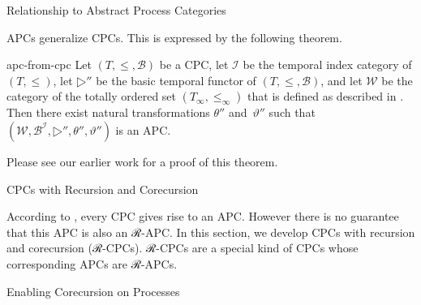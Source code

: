 \documentclass[copyright,creativecommons]{eptcs}
\begin{document}
              {Relationship to Abstract Process Categories}

APCs generalize CPCs. This is expressed by the following theorem.

\begin{exttheorem}{apc-from-cpc}
Let $(T, ≤, ℬ)$ be a CPC, let $ℐ$ be the temporal index category of $(T, ≤)$,
let $▷″$ be the basic temporal functor of $(T, ≤, ℬ)$, and let $𝒲$ be the
category of the totally ordered set $(T_∞, ≤_∞)$ that is defined as described in
. Then there exist natural
transformations $θ″$ and~$ϑ″$ such that $\left(𝒲, ℬ^ℐ, ▷″, θ″, ϑ″\right)$ is an
APC.
\end{exttheorem}

Please see our earlier work \cite[proof of Theorem~10]{jeltsch:plpv-2014} for a
proof of this theorem.

           {CPCs with Recursion and Corecursion}


According to , every CPC gives rise to an APC. However
there is no guarantee that this APC is also an ℛ-APC. In this section, we
develop CPCs with recursion and corecursion (ℛ-CPCs). ℛ-CPCs are a special kind
of CPCs whose corresponding APCs are ℛ-APCs.

              {Enabling Corecursion on Processes}
\end{document}
